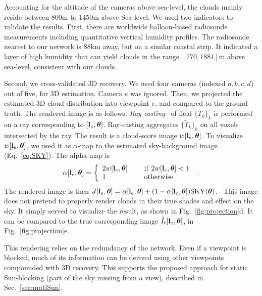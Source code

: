 \documentclass[runningheads]{llncs}
\begin{document}
Accounting for the altitude of the cameras above sea-level, the clouds mainly reside between 800m to 1450m above Sea-level. We used two indicators to validate the results. First, there are worldwide balloon-based radiosonde measurements including quantitative vertical humidity profiles. The radiosonde nearest to our network is 88km away, but on a similar coastal strip. It indicated a layer of high humidity that can yield clouds in the range $[770,1881]$m above sea-level, consistent with our clouds.

Second, we cross-validated 3D recovery. We used four cameras (indexed $a,b,c,d$) out of five, for 3D estimation. Camera $e$ was ignored. Then, we projected the estimated 3D cloud distribution into viewpoint $e$, and compared to the ground truth. The rendered image is as follows. {\em Ray casting}~\cite{Levoy1990} of  field $\{\tilde T_k\}_k$ is performed on a ray corresponding to
$[{\bf l}_e,{\bm \theta}]$. Ray-casting aggregates $\{\tilde T_k\}_k$ on all voxels intersected by the ray. The result is a cloud-score image $w[{\bf l}_e,{\bm \theta}]$.
To visualize $w[{\bf l}_e,{\bm \theta}]$, we used it as $\alpha$-map to the estimated sky-background image (Eq.~\ref{eq:SKY}). The alpha-map is
\begin{equation}
 \alpha[{\bf l}_e,{\bm \theta}]=\left\{
      \begin{array}{ll}
      2w[{\bf l}_e,{\bm \theta}]
      & ~~~~{\rm if}~ 2w[{\bf l}_e,{\bm \theta}]<1 \\
      1
      & ~~~~{\rm otherwise}
      \end{array}
      \right.
  \;.
 \label{eq:alpha}
\end{equation}
The rendered image is then
 $J[{\bf l}_e,{\bm \theta}]=
 \alpha[{\bf l}_e,{\bm \theta}]+(1-\alpha[{\bf l}_e,{\bm \theta}]){\rm SKY}({\bm \theta})$.~
This image does not pretend to properly render clouds in their true shades and effect on the sky. It simply served to visualize the result, as shown in Fig.~\ref{fig:projection}d. It can be compared to the true corresponding image $\hat I_t[{\bf l}_e,{\bm \theta}]$, in Fig.~\ref{fig:projection}e.

This rendering relies on the redundancy of the network. Even if a viewpoint is blocked, much of its information can be derived using other viewpoints compounded with 3D recovery. This supports the proposed approach for static Sun-blocking (part of the sky missing from a view), described in Sec.~\ref{sec:mutiSun}.
\end{document}
